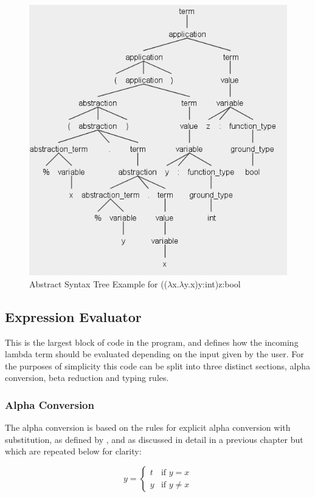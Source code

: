 \documentclass[a4paper,12pt]{report}
\begin{document}
\begin{figure}[p]
	\centering
	\includegraphics[scale=0.4]{images/abstract_syntax_types}
	\caption{Abstract Syntax Tree Example for (($\lambda$x.$\lambda$y.x)y:int)z:bool}
	\label{abstract_syntax_tree_example}
\end{figure}

\subsection{Expression Evaluator}
This is the largest block of code in the program, and defines how the incoming lambda term should be evaluated depending on the input given by the user. For the purposes of simplicity this code can be split into three distinct sections, alpha conversion, beta reduction and typing rules.

\subsubsection{Alpha Conversion}
The alpha conversion is based on the rules for explicit alpha conversion with substitution, as defined by \cite{Acar2008}, and as discussed in detail in a previous chapter but which are repeated below for clarity:

\begin{equation*}
[t/x]y=\begin{cases}
t & \text{if $y=x$}\\
y & \text{if $y\ne x$}
\end{cases}
\end{equation*}
\end{document}
